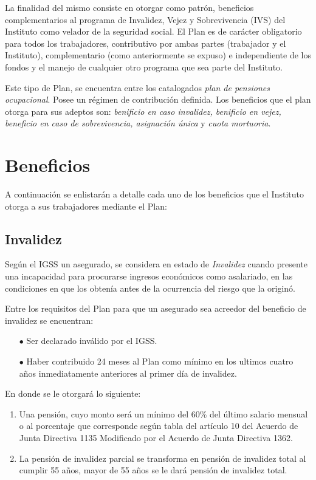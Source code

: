 \documentclass[12pt,letterpaper,titlepage]{article}
\begin{document}
La finalidad del mismo consiste en otorgar como patrón, beneficios complementarios al programa de Invalidez, Vejez y Sobrevivencia (IVS) del Instituto como velador de la seguridad social. El Plan es de carácter obligatorio para todos los trabajadores, contributivo por ambas partes (trabajador y el Instituto), complementario (como anteriormente se expuso) e independiente de los fondos y el manejo de cualquier otro programa que sea parte del Instituto.

Este tipo de Plan, se encuentra entre los catalogados \textit{plan de pensiones ocupacional}. Posee un régimen de contribución definida. Los beneficios que el plan otorga para sus adeptos son: \textit{benificio en caso invalidez, benificio en vejez, beneficio en caso de sobrevivencia, asignación única} y \textit{cuota mortuoria}.

\newpage
\section{Beneficios}

A continuación se enlistarán a detalle cada uno de los beneficios que el Instituto otorga a sus trabajadores mediante el Plan:

\subsection{Invalidez}

Según el IGSS un asegurado, se considera en estado de \textit{Invalidez} cuando presente una incapacidad para procurarse ingresos económicos como asalariado, en las condiciones en que los obtenía antes de la ocurrencia del riesgo que la originó. 

Entre los requisitos del Plan para que un asegurado sea acreedor del beneficio de invalidez se encuentran:
\begin{itemize}
	\item [$\bullet$] Ser declarado inválido por el IGSS.
	\item [$\bullet$] Haber contribuido 24 meses al Plan como mínimo en los ultimos cuatro años inmediatamente anteriores al primer día de invalidez.
\end{itemize}

En donde se le otorgará lo siguiente:
\begin{enumerate}
	\item Una pensión, cuyo monto será un mínimo del 60\% del último salario mensual o al porcentaje que corresponde según tabla del artículo 10 del Acuerdo de Junta Directiva 1135 Modificado por el Acuerdo de Junta Directiva 1362.
	\item La pensión de invalidez parcial se transforma en pensión de invalidez total al cumplir 55 años, mayor de 55 años se le dará pensión de invalidez total.
\end{enumerate}
\end{document}
